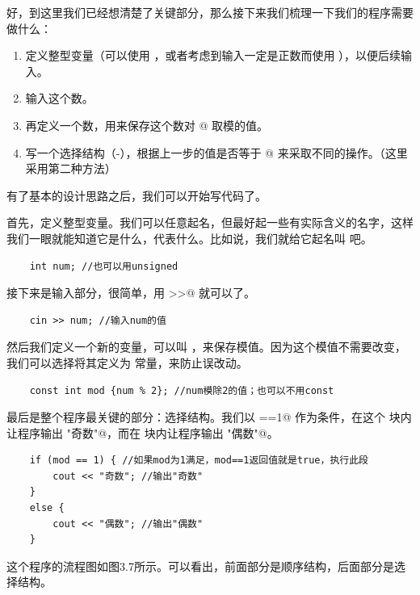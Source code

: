好，到这里我们已经想清楚了关键部分，那么接下来我们梳理一下我们的程序需要做什么：
\begin{enumerate}
    \item 定义整型变量（可以使用 \lstinline@int@，或者考虑到输入一定是正数而使用 \lstinline@unsigned@），以便后续输入。
    \item 输入这个数。
    \item 再定义一个数，用来保存这个数对 @ 取模的值。
    \item 写一个选择结构（\lstinline@if@-\lstinline@else@），根据上一步的值是否等于 @ 来采取不同的操作。（这里采用第二种方法）
\end{enumerate}
有了基本的设计思路之后，我们可以开始写代码了。\par
首先，定义整型变量。我们可以任意起名，但最好起一些有实际含义的名字，这样我们一眼就能知道它是什么，代表什么。比如说，我们就给它起名叫 \lstinline@num@ 吧。
\begin{lstlisting}
    int num; //也可以用unsigned
\end{lstlisting}
接下来是输入部分，很简单，用 \lstinline@cin>>@ 就可以了。
\begin{lstlisting}
    cin >> num; //输入num的值
\end{lstlisting}
然后我们定义一个新的变量，可以叫 \lstinline@mod@，来保存模值。因为这个模值不需要改变，我们可以选择将其定义为 \lstinline@const@ 常量，来防止误改动。
\begin{lstlisting}
    const int mod {num % 2}; //num模除2的值；也可以不用const
\end{lstlisting}\par
最后是整个程序最关键的部分：选择结构。我们以 \lstinline@mod==1@ 作为条件，在这个 \lstinline@if@ 块内让程序输出 \lstinline@"奇数"@，而在 \lstinline@else@ 块内让程序输出 \lstinline@"偶数"@。
\begin{lstlisting}
    if (mod == 1) { //如果mod为1满足，mod==1返回值就是true，执行此段
        cout << "奇数"; //输出"奇数"
    }
    else {
        cout << "偶数"; //输出"偶数"
    }
\end{lstlisting}
这个程序的流程图如图3.7所示。可以看出，前面部分是顺序结构，后面部分是选择结构。\par
